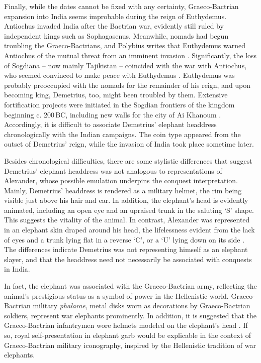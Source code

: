 \documentclass{ijsra}
\renewcommand\BC{{\,BC\xspace}}
\begin{document}
Finally, while the dates cannot be fixed with any certainty, Graeco-Bactrian expansion into India seems improbable during the reign of Euthydemus.
Antiochus invaded India after the Bactrian war, evidently still ruled by independent kings such as Sophagasenus.
Meanwhile, nomads had begun troubling the Graeco-Bactrians, and Polybius writes that Euthydemus warned Antiochus of the mutual threat from an imminent invasion \parencite[]{Pol. Hist.11.34}.
Significantly, the loss of Sogdiana – now mainly Tajikistan – coincided with the war with Antiochus, who seemed convinced to make peace with Euthydemus \parencites[38--39]{Holt1981}[135]{Holt1999}.
Euthydemus was probably preoccupied with the nomads for the remainder of his reign, and upon becoming king, Demetrius, too, might been troubled by them.
Extensive fortification projects were initiated in the Sogdian frontiers of the kingdom beginning c. 200\BC, including new walls for the city of Ai Khanoum \parencites[38--39]{Holt1981}[135]{Holt1999}[60--61]{Lerner1999}[236]{Widemann2000}.
Accordingly, it is difficult to associate Demetrius’ elephant headdress chronologically with the Indian campaigns.
The coin type appeared from the outset of Demetrius’ reign, while the invasion of India took place sometime later.

Besides chronological difficulties, there are some stylistic differences that suggest Demetrius’ elephant headdress was not analogous to representations of Alexander, whose possible emulation underpins the conquest interpretation.
Mainly, Demetrius’ headdress is rendered as a military helmet, the rim being visible just above his hair and ear.
In addition, the elephant’s head is evidently animated, including an open eye and an upraised trunk in the saluting ‘S’ shape.
This suggests the vitality of the animal.
In contrast, Alexander was represented in an elephant skin draped around his head,
the lifelessness evident from the lack of eyes and a trunk lying flat in
a reverse ‘C’, or a ‘U’ lying down on its side \parencites[11]{Dahmen2007}[37]{Marcinkiewicz-Joseph2016}[48]{Maritz2004}[63]{Smith1986}.
The differences indicate Demetrius was not representing himself as an elephant slayer, and that the headdress need not necessarily be associated with conquests in India. 

In fact, the elephant was associated with the Graeco-Bactrian army, reflecting the animal’s prestigious status as a symbol of power in the Hellenistic world.
Graeco-Bactrian military \emph{phalarae}, metal disks worn as decorations by Graeco-Bactrian soldiers, represent war elephants prominently.
In addition, it is suggested that the Graeco-Bactrian infantrymen wore helmets modeled on the elephant’s head \parencites[170]{Abduallaev1995}[1206-1211]{Bannikov2013}[9--10]{Pfrommer1993}[588]{Treister1999}.
If so, royal self-presentation in elephant garb would be explicable in the context of Graeco-Bactrian military iconography, inspired by the Hellenistic tradition of war elephants.
\end{document}
